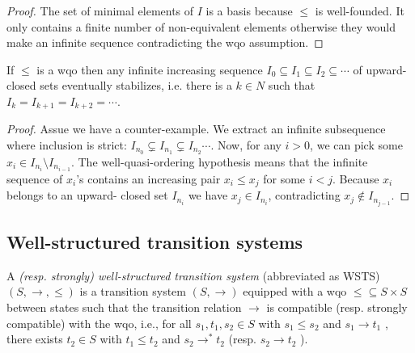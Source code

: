 \begin{proof}
The set of minimal elements of $I$ is a basis because $\leq$ is well-founded. It
only contains a finite number of non-equivalent elements otherwise they would make
an infinite sequence contradicting the wqo assumption.
\end{proof}



\begin{lemma}  \label{upward-closed stablizes}
If $\leq$ is a wqo then any infinite increasing sequence $I_0 \subseteq I_1 \subseteq I_2 \subseteq \cdots$ of
upward-closed sets eventually stabilizes, i.e. there is a $k \in N$ such that 
$I_k = I_{k+1} = I_{k+2} = \cdots $.
\end{lemma}

\begin{proof}
Assue we have a counter-example.
We extract an infinite subsequence where
inclusion is strict: $I_{n_0} \subsetneq I_{n_1} \subsetneq I_{n_2} \cdots$. Now, for any $i>0$, we can pick some $x_i \in I_{n_i} \setminus I_{n_{i-1}}$. The well-quasi-ordering hypothesis means that the infinite sequence of $x_i$'s
contains an increasing pair $x_i \leq x_j$ for some $i<j$. Because $x_i$ belongs to an upward-
closed set $I_{n_i}$ we have $x_j \in I_{n_i} $, contradicting $x_j \not\in I_{n_{ j - 1}}$.
\end{proof}




\subsection{Well-structured transition systems}


\begin{definition}\cite{DBLP:journals/iandc/Finkel90,DBLP:journals/tcs/FinkelS01}
A {\em (resp. strongly) well-structured transition system} (abbreviated as WSTS)  $(S, \rightarrow, \leq)$
is a transition system $(S, \rightarrow)$
equipped with a wqo ${\leq} \subseteq S \times S$ between states such that  
the transition relation $ \rightarrow$ is compatible (resp. strongly compatible) with the wqo, i.e., for all 
$s_1, t_1 , s_2 \in S$
	with $s_1 \leq s_2$  and $s_1 \rightarrow t_1$ , there exists 
	$t_2 \in S$ with 
	$t_1 \leq t_2$ and $s_2 \rightarrow^{*} t_2$ 			
				(resp. $s_2 \rightarrow t_2$ ).
\end{definition}

